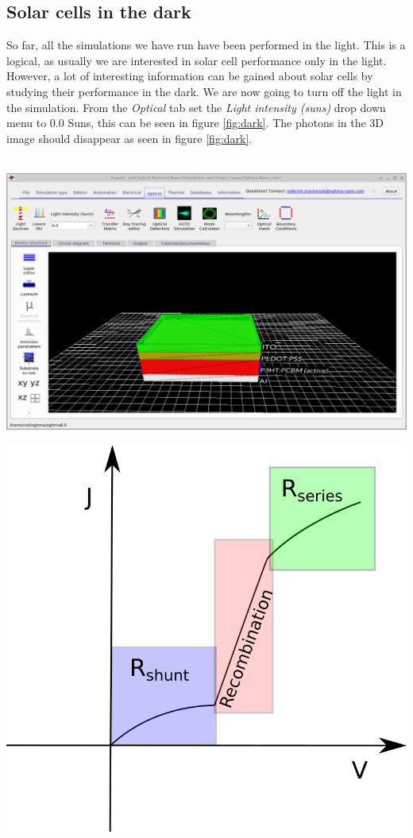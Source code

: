 \pagebreak
\subsection{Solar cells in the dark}
So far, all the simulations we have run have been performed in the light.  This is a logical, as usually we are interested in solar cell performance only in the light.  However, a lot of interesting information can be gained about solar cells by studying their performance in the dark.  We are now going to turn off the light in the simulation.  From the \emph{Optical} tab set the \emph{Light intensity (suns)} drop down menu to 0.0 Suns, this can be seen in figure \ref{fig:dark}.  The photons in the 3D image should disappear as seen in figure \ref{fig:dark}.
\\
\\
\begin{minipage}{0.45\textwidth}
\centering
\includegraphics[width=\textwidth,height=0.7\textwidth]{./images/running/dark.png}
\label{fig:dark}
\end{minipage}
\hspace*{10px}
\begin{minipage}[]{0.45\linewidth}
\centering
\includegraphics[width=\textwidth,height=0.7\textwidth]{./images/running/jv_dark.png}
\label{fig:jv_dark}
\end{minipage}
